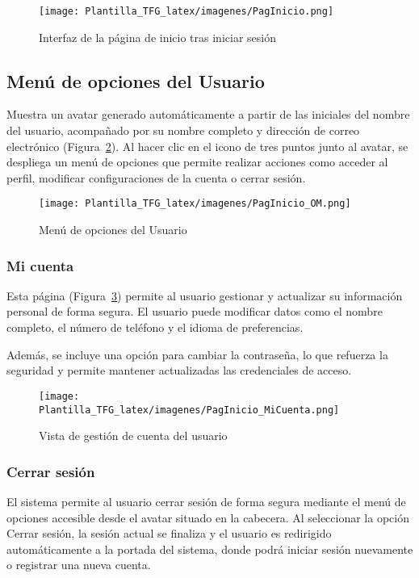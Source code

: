 \begin{figure}[t]
    \centering
    \texttt{[image: Plantilla\_TFG\_latex/imagenes/PagInicio.png]}
    \caption{Interfaz de la página de inicio tras iniciar sesión}
    \label{fig:pagina_inicio}
\end{figure}

\subsection{Menú de opciones del Usuario}
Muestra un avatar generado automáticamente a partir de las iniciales del nombre del usuario, acompañado por su nombre completo y dirección de correo electrónico (Figura~\ref{fig:PagInicio_menuO}). Al hacer clic en el icono de tres puntos junto al avatar, se despliega un menú de opciones que permite realizar acciones como acceder al perfil, modificar configuraciones de la cuenta o cerrar sesión.
\begin{figure}
    \centering
    \texttt{[image: Plantilla\_TFG\_latex/imagenes/PagInicio\_OM.png]}
    \caption{Menú de opciones del Usuario}
    \label{fig:PagInicio_menuO}
\end{figure}

\subsubsection{Mi cuenta}
Esta página (Figura~\ref{fig:PagInicio_MiCuenta}) permite al usuario gestionar y actualizar su información personal de forma segura. El usuario puede modificar datos como el nombre completo, el número de teléfono y el idioma de preferencias.

Además, se incluye una opción para cambiar la contraseña, lo que refuerza la seguridad y permite mantener actualizadas las credenciales de acceso.

\begin{figure}
    \centering
    \texttt{[image: Plantilla\_TFG\_latex/imagenes/PagInicio\_MiCuenta.png]}
    \caption{Vista de gestión de cuenta del usuario}
    \label{fig:PagInicio_MiCuenta}
\end{figure}

\subsubsection{Cerrar sesión}

El sistema permite al usuario cerrar sesión de forma segura mediante el menú de opciones accesible desde el avatar situado en la cabecera. Al seleccionar la opción Cerrar sesión, la sesión actual se finaliza y el usuario es redirigido automáticamente a la portada del sistema, donde podrá iniciar sesión nuevamente o registrar una nueva cuenta.

